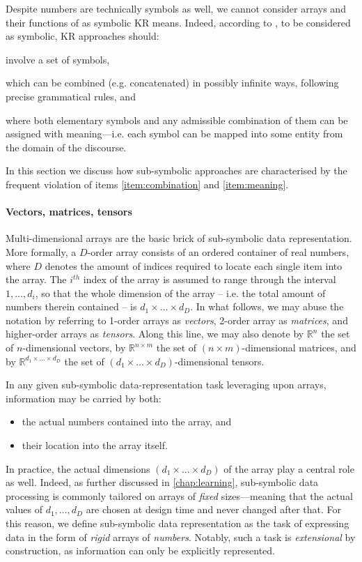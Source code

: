 \documentclass[12pt,a4paper,openright,twoside]{book}
\begin{document}
Despite numbers are technically symbols as well, we cannot consider arrays and their functions of as symbolic KR means.
%
Indeed, according to \cite{Gelder90}, to be considered as symbolic, KR approaches should:
%
\begin{inlinelist}
    \item involve a set of symbols,
    \item\label{item:combination} which can be combined (e.g. concatenated) in possibly infinite ways, following precise grammatical rules, and
    \item\label{item:meaning} where both elementary symbols and any admissible combination of them can be assigned with meaning---i.e. each symbol can be mapped into some entity from the domain of the discourse.
\end{inlinelist}
%
In this section we discuss how sub-symbolic approaches are characterised by the frequent violation of items \ref{item:combination} and \ref{item:meaning}.

\paragraph{Vectors, matrices, tensors}

Multi-dimensional arrays are the basic brick of sub-symbolic data representation.
%
More formally, a $D$-order array consists of an ordered container of real numbers, where $D$ denotes the amount of indices required to locate each single item into the array.
%
The $i^{th}$ index of the array is assumed to range through the interval $1, \ldots, d_i$, so that the whole dimension of the array -- i.e. the total amount of numbers therein contained -- is $d_1 \times \ldots \times d_D$.
%
In what follows, we may abuse the notation by referring to 1-order arrays as \emph{vectors}, 2-order array as \emph{matrices}, and higher-order arrays as \emph{tensors}.
%
Along this line, we may also denote by $\mathbb{R}^{n}$ the set of $n$-dimensional vectors, by $\mathbb{R}^{n \times m}$ the set of $(n \times m)$-dimensional matrices, and by $\mathbb{R}^{d_1 \times \ldots \times d_D}$ the set of $(d_1 \times \ldots \times d_D)$-dimensional tensors.

In any given sub-symbolic data-representation task leveraging upon arrays, information may be carried by both:
%
\begin{itemize}
    \item the actual numbers contained into the array, and
    \item their location into the array itself.
\end{itemize}
%
In practice, the actual dimensions $(d_1 \times \ldots \times d_D)$ of the array play a central role as well.
%
Indeed, as further discussed in \cref{chap:learning}, sub-symbolic data processing is commonly tailored on arrays of \emph{fixed} sizes---meaning that the actual values of $d_1, \ldots, d_D$ are chosen at design time and never changed after that.
%
For this reason, we define sub-symbolic data representation as the task of expressing data in the form of \emph{rigid} arrays of \emph{numbers}.
%
Notably, such a task is \emph{extensional} by construction, as information can only be explicitly represented.
\end{document}
